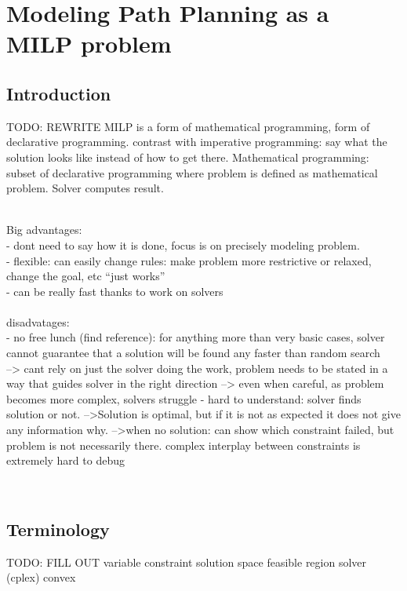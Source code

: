 \section{Modeling Path Planning as a MILP problem}
\subsection{Introduction}
TODO: REWRITE
MILP is a form of mathematical programming, form of declarative programming. contrast with imperative programming: say what the solution looks like instead of how to get there. Mathematical programming: subset of declarative programming where problem is defined as mathematical problem. Solver computes result.

\\
Big advantages: \\
- dont need to say how it is done, focus is on precisely modeling problem.\\
- flexible: can easily change rules: make problem more restrictive or relaxed, change the goal, etc ``just works''\\
- can be really fast thanks to work on solvers\\
\\
disadvatages:\\
- no free lunch (find reference): for anything more than very basic cases, solver cannot guarantee that a solution will be found any faster than random search\\
	--> cant rely on just the solver doing the work, problem needs to be stated in a way that guides solver in the right direction
	--> even when careful, as problem becomes more complex, solvers struggle
-  hard to understand: solver finds solution or not.
	-->Solution is optimal, but if it is not as expected it does not give any information why.
	-->when no solution: can show which constraint failed, but problem is not necessarily there. complex interplay between constraints is extremely hard to debug

\\


\subsection{Terminology}
TODO: FILL OUT
variable
constraint
solution space
feasible region
solver (cplex)
convex

